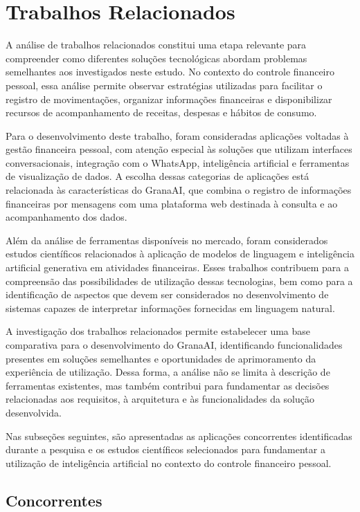 \section{Trabalhos Relacionados}

A análise de trabalhos relacionados constitui uma etapa relevante para compreender como diferentes soluções tecnológicas abordam problemas semelhantes aos investigados neste estudo. No contexto do controle financeiro pessoal, essa análise permite observar estratégias utilizadas para facilitar o registro de movimentações, organizar informações financeiras e disponibilizar recursos de acompanhamento de receitas, despesas e hábitos de consumo.

Para o desenvolvimento deste trabalho, foram consideradas aplicações voltadas à gestão financeira pessoal, com atenção especial às soluções que utilizam interfaces conversacionais, integração com o WhatsApp, inteligência artificial e ferramentas de visualização de dados. A escolha dessas categorias de aplicações está relacionada às características do GranaAI, que combina o registro de informações financeiras por mensagens com uma plataforma web destinada à consulta e ao acompanhamento dos dados.

Além da análise de ferramentas disponíveis no mercado, foram considerados estudos científicos relacionados à aplicação de modelos de linguagem e inteligência artificial generativa em atividades financeiras. Esses trabalhos contribuem para a compreensão das possibilidades de utilização dessas tecnologias, bem como para a identificação de aspectos que devem ser considerados no desenvolvimento de sistemas capazes de interpretar informações fornecidas em linguagem natural.

A investigação dos trabalhos relacionados permite estabelecer uma base comparativa para o desenvolvimento do GranaAI, identificando funcionalidades presentes em soluções semelhantes e oportunidades de aprimoramento da experiência de utilização. Dessa forma, a análise não se limita à descrição de ferramentas existentes, mas também contribui para fundamentar as decisões relacionadas aos requisitos, à arquitetura e às funcionalidades da solução desenvolvida.

Nas subseções seguintes, são apresentadas as aplicações concorrentes identificadas durante a pesquisa e os estudos científicos selecionados para fundamentar a utilização de inteligência artificial no contexto do controle financeiro pessoal.

\subsection{Concorrentes}

